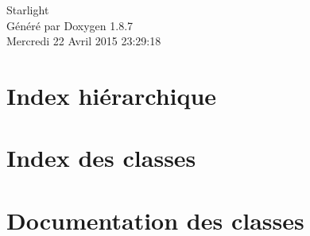 \documentclass[twoside]{book}
\newcommand{\+}{\discretionary{\mbox{\scriptsize$\hookleftarrow$}}{}{}}
\newcommand{\clearemptydoublepage}{%
  \newpage{\pagestyle{empty}\cleardoublepage}%
}
\begin{document}
\hypersetup{pageanchor=false,
             bookmarks=true,
             bookmarksnumbered=true,
             pdfencoding=unicode
            }
\begin{titlepage}
\vspace*{7cm}
\begin{center}%
{\Large Starlight }\\
\vspace*{1cm}
{\large Généré par Doxygen 1.8.7}\\
\vspace*{0.5cm}
{\small Mercredi 22 Avril 2015 23:29:18}\\
\end{center}
\end{titlepage}
\clearemptydoublepage
\tableofcontents
\clearemptydoublepage
{}
\hypersetup{pageanchor=true}

\chapter{Index hiérarchique}

\chapter{Index des classes}

\chapter{Documentation des classes}













































\newpage
{}
{}
\printindex
\end{document}
